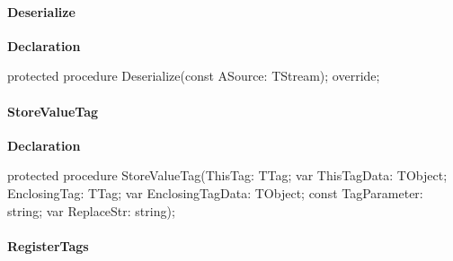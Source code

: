 \documentclass{report}
\newif\ifpdf
\begin{document}
\paragraph*{Deserialize}\hspace*{\fill}

\label{PasDoc_Items.TPasEnum-Deserialize}
\begin{list}{}{
\setlength{\itemindent}{0cm}
\setlength{\listparindent}{0cm}
\setlength{\leftmargin}{\evensidemargin}
\addtolength{\leftmargin}{\tmplength}
\settowidth{\labelsep}{X}
\addtolength{\leftmargin}{\labelsep}
\setlength{\labelwidth}{\tmplength}
}
\item[\textbf{Declaration}\hfill]
\ifpdf
\begin{flushleft}
\fi
\begin{ttfamily}
protected procedure Deserialize(const ASource: TStream); override;\end{ttfamily}

\ifpdf
\end{flushleft}
\fi

\end{list}
\paragraph*{StoreValueTag}\hspace*{\fill}

\label{PasDoc_Items.TPasEnum-StoreValueTag}
\begin{list}{}{
\setlength{\itemindent}{0cm}
\setlength{\listparindent}{0cm}
\setlength{\leftmargin}{\evensidemargin}
\addtolength{\leftmargin}{\tmplength}
\settowidth{\labelsep}{X}
\addtolength{\leftmargin}{\labelsep}
\setlength{\labelwidth}{\tmplength}
}
\item[\textbf{Declaration}\hfill]
\ifpdf
\begin{flushleft}
\fi
\begin{ttfamily}
protected procedure StoreValueTag(ThisTag: TTag; var ThisTagData: TObject; EnclosingTag: TTag; var EnclosingTagData: TObject; const TagParameter: string; var ReplaceStr: string);\end{ttfamily}

\ifpdf
\end{flushleft}
\fi

\end{list}
\paragraph*{RegisterTags}\hspace*{\fill}
\end{document}
